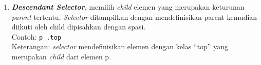 \begin{enumerate}
	\item \textit{\textbf{Descendant Selector}}, memilih \textit{child} elemen yang merupakan keturunan \textit{parent} tertentu. \textit{Selector} ditampilkan dengan mendefinisikan parent kemudian diikuti oleh child dipisahkan dengan spasi.\\
			Contoh: \texttt{p .top}\\
			Keterangan: \textit{selector} mendefinisikan elemen dengan kelas ``top'' yang merupakan \textit{child} dari elemen p. 
\end{enumerate}		


